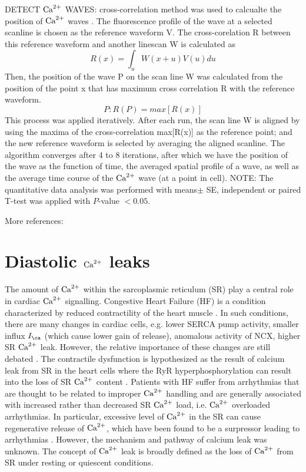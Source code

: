 DETECT ${\text{Ca}^{2+}}$ WAVES: cross-correlation method was used to calcualte the position
of ${\text{Ca}^{2+}}$ waves \citep{cheng1996csc}. The fluorescence profile of the wave at a
selected scanline is chosen as the reference waveform V. The cross-corelation R
between this reference waveform and another linescan W is calculated as
\begin{equation}
R(x) = \int_u W(x+u)V(u)du
\end{equation}
Then, the position of the wave P on the scan line W was calculated from the
position of the point x that has maximum cross correlation R with the reference
waveform.
\begin{equation}
P: R(P) = max[R(x)]
\end{equation}
This process was applied iteratively. After each run, the scan line W is aligned
by using the maxima of the cross-correlation max[R(x)] as the reference point;
and the new reference waveform is selected by averaging the aligned scanline.
The algorithm converges after 4 to 8 iterations, after which we have the
position of the wave as the function of time, the averaged spatial profile of a
wave, as well as the average time course of the ${\text{Ca}^{2+}}$ wave (at a point in cell). 
NOTE: The quantitative data analysis was performed with means$\pm$ SE,
independent or paired T-test was applied with  $P$-value $< 0.05$.


More references:
~\citep{berlin1989}

\section{Diastolic ${\text{Ca}^{2+}}$ leaks}
\label{sec:calcium_leak}
 
The amount of ${\text{Ca}^{2+}}$ within the sarcoplasmic reticulum (SR) play a central role
in cardiac ${\text{Ca}^{2+}}$ signalling.  Congestive Heart Failure (HF) is a condition
characterized by reduced contractility of the heart muscle \citep{hasenfuss2002,
sjaastad2002}. In such conditions, there are many changes in cardiac cells, e.g.
lower SERCA pump activity, smaller influx $I_\ca$ (which cause lower gain of
release), anomalous activity of NCX, higher SR ${\text{Ca}^{2+}}$ leak. However, the relative
importance of these changes are still debated \citep{bers2003, marks2003}. The
contractile dysfunction is hypothesized as the result of calcium leak from SR in
the heart cells where the RyR hyperphosphorylation can result into the loss of
SR ${\text{Ca}^{2+}}$ content \citep{wang2005ecc}. Patients with HF suffer from arrhythmias
that are thought to be related to improper ${\text{Ca}^{2+}}$ handling and are generally associated with
increased rather than decreased SR ${\text{Ca}^{2+}}$ load, i.e.
${\text{Ca}^{2+}}$ overloaded arrhythmias. In particular, excessive level of ${\text{Ca}^{2+}}$ in the SR
can cause regenerative release of ${\text{Ca}^{2+}}$, which have been found to be a
surpressor leading to arrhythmias \citep{lederer1976, kass1978, berlin1989,
cheng1996csc}. However, the mechanism and pathway of calcium leak was unknown.
The concept of ${\text{Ca}^{2+}}$ leak is broadly defined as the loss of ${\text{Ca}^{2+}}$ from SR under
resting or quiescent conditions.

